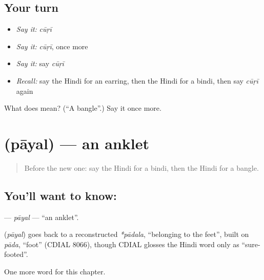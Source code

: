 \subsection*{Your turn}
\begin{itemize}
\raggedright
  \item \emph{Say it:} \emph{cūṛī}
  \item \emph{Say it:} \emph{cūṛī}, once more
  \item \emph{Say it:} say \emph{cūṛī}
  \item \emph{Recall:} say the Hindi for an earring, then the Hindi for a bindi, then say \emph{cūṛī} again
\end{itemize}

\begin{tcolorbox}[breakable,colback=teal!4,colframe=teal!35!black,title={Before you move on}]
What does  mean? (\textquotedblleft{}A bangle\textquotedblright{}.) Say it once more.
\end{tcolorbox}
\section[\texorpdfstring{\hi{पायल} (pāyal)}{पायल (pāyal)}]{ (pāyal) — an anklet}

\label{lesson:HI-C263-payal}



\begin{quote}
Before the new one: say the Hindi for a bindi, then the Hindi for a bangle.
\end{quote}

\subsection*{You'll want to know: }
\textbf{} — \emph{pāyal} — \textquotedblleft{}an anklet\textquotedblright{}.

\begin{cousinweb}
\textbf{} (\emph{pāyal}) goes back to a reconstructed \emph{*pādala}, \textquotedblleft{}belonging to the feet\textquotedblright{}, built on \emph{pāda}, \textquotedblleft{}foot\textquotedblright{} (CDIAL 8066), though CDIAL glosses the Hindi word only as \textquotedblleft{}sure-footed\textquotedblright{}.
\end{cousinweb}

\begin{grammarlens}[title={What you've built}]
One more word for this chapter.
\end{grammarlens}

